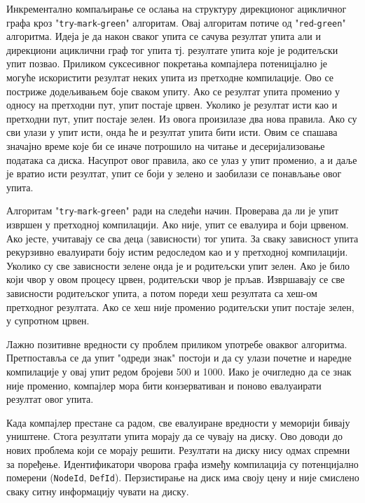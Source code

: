 Инкрементално компаљирање се ослања на структуру дирекционог ацикличног графа кроз "\verb|try|-\verb|mark|-\verb|green|" алгоритам.
Овај алгоритам потиче од "\verb|red|-\verb|green|" алгоритма. Идеја је да након сваког упита се сачува резултат упита али и дирекциони 
ациклични граф тог упита тј. резултате упита које је родитељски упит позвао. Приликом суксесивног покретања компајлера потеницјално 
је могуће искористити резултат неких упита из претходне компилације. Ово се постриже додељивањем боје сваком упиту. Ако се резултат 
упита променио у односу на претходни пут, упит постаје црвен. Уколико је резултат исти као и претходни пут, упит постаје зелен. 
Из овога произилазе два нова правила. Ако су сви улази у упит исти, онда ће и резултат упита бити исти. Овим се спашава значајно време 
које би се иначе потрошило на читање и десеријализовање података са диска. Насупрот овог правила, ако се улаз у упит променио, 
а и даље је вратио исти резултат, упит се боји у зелено и заобилази се понављање овог упита.

Алгоритам "\verb|try|-\verb|mark|-\verb|green|" ради на следећи начин. Проверава да ли је упит извршен у претходној компилацији. Ако 
није, упит се евалуира и боји црвеном. Ако јесте, учитавају се сва деца (зависности) тог упита. За сваку зависност упита рекурзивно 
евалуирати боју истим редоследом као и у претходној компилацији. Уколико су све зависности зелене онда је и родитељски упит зелен.
Ако је било који чвор у овом процесу црвен, родитељски чвор је прљав. Извршавају се све зависности родитељског упита, а потом 
пореди хеш резултата са хеш-ом претходног резултата. Ако се хеш није променио родитељски упит постаје зелен, у супротном црвен.

Лажно позитивне вредности су проблем приликом употребе оваквог алгоритма. Претпоставља се да упит "одреди знак" постоји и да су 
улази почетне и наредне компилације у овај упит редом бројеви 500 и 1000. Иако је очигледно да се знак није променио, компајлер 
мора бити конзервативан и поново евалуаирати резултат овог упита.

Када компајлер престане са радом, све евалуиране вредности у меморији бивају уништене. Стога резултати упита морају да се чувају 
на диску. Ово доводи до нових проблема који се морају решити. Резултати на диску нису одмах спремни за поређење. Идентификатори 
чворова графа између компилација су потенцијално померени (\verb|NodeId|, \verb|DefId|). Перзистирање на диск има своју цену и 
није смислено сваку ситну информацију чувати на диску. 


